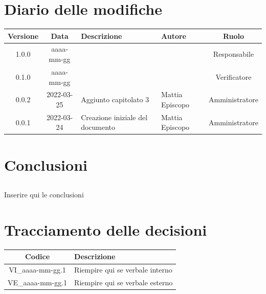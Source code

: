 \documentclass[12pt, a4paper,table]{article}
\begin{document}
	\section*{Diario delle modifiche}
	\begin{center}
	\renewcommand{\arraystretch}{1.8} %
	\begin{tabular}{ |c|c|m{12em}|m{7em}|c| }
	\hline
	\textbf{Versione} & \textbf{Data} & \textbf{Descrizione} &  \textbf{Autore} &  \textbf{Ruolo} \\
	\hline
	1.0.0 & aaaa-mm-gg &  & \docApprovazione & Responsabile\\ %
	\hline
	0.1.0 & aaaa-mm-gg &  & \docVerificatori & Verificatore\\ %
	\hline
    	0.0.2 & 2022-03-25 & Aggiunto capitolato 3 & Mattia \newline Episcopo & Amministratore\\  %
    	0.0.1 & 2022-03-24 & Creazione iniziale del documento & Mattia \newline Episcopo & Amministratore\\  %
	\hline
	\end{tabular}
	\end{center}
	\newpage
	
	\tableofcontents
	\newpage
	
	\newpage
	\newpage
		
	\newpage
	
	\newpage
	\section{Conclusioni}
	    \subsection {} Inserire qui le conclusioni
	\newpage
	
	\section*{Tracciamento delle decisioni}
	\renewcommand{\arraystretch}{1.8} %
	\begin{tabular}{ |c|l| }
		\hline
		\textbf{Codice} & \textbf{Descrizione} \\
		\hline
		VI\_aaaa-mm-gg.1 & Riempire qui se verbale interno\\ \hline
		VE\_aaaa-mm-gg.1 & Riempire qui se verbale esterno\\ \hline
	\end{tabular}
\end{document}
